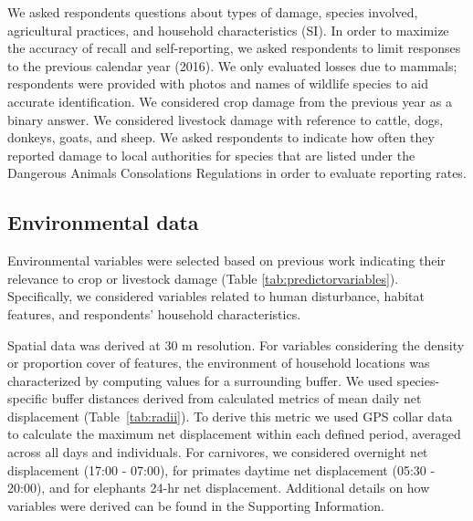 \documentclass[12pt,]{article}
\begin{document}
We asked respondents questions about types of damage, species involved, agricultural practices, and household characteristics (SI). %
In order to maximize the accuracy of recall and self-reporting, we asked respondents to limit responses to the previous calendar year (2016). We only evaluated losses due to mammals; respondents were provided with photos and names of wildlife species to aid accurate identification. We considered crop damage from the previous year as a binary answer. We considered livestock damage with reference to cattle, dogs, donkeys, goats, and sheep. We asked respondents to indicate how often they reported damage to local authorities for species that are listed under the Dangerous Animals Consolations Regulations \citep{URT2011} in order to evaluate reporting rates. 
 
\subsection{Environmental data}
Environmental variables were selected based on previous work indicating their relevance to crop or livestock damage (Table \ref{tab:predictorvariables}). Specifically, we considered variables related to human disturbance, habitat features, and respondents' household characteristics. 

Spatial data was derived at 30 m resolution. For variables considering the density or proportion cover of features, the environment of household locations was characterized by computing values for a surrounding buffer. We used species-specific buffer distances derived from calculated metrics of mean daily net displacement (Table~\ref{tab:radii}). To derive this metric we used GPS collar data to calculate the maximum net displacement within each defined period, averaged across all days and individuals. For carnivores, we considered overnight net displacement (17:00 - 07:00), for primates daytime net displacement (05:30 - 20:00), and for elephants 24-hr net displacement. Additional details on how variables were derived can be found in the Supporting Information.
\end{document}
